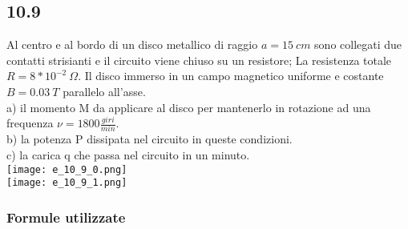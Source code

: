 \documentclass[../../main.tex]{subfiles}
\begin{document}
\subsection*{10.9}
Al centro e al bordo di un disco metallico di raggio $a=15\ cm$ sono collegati due contatti strisianti e il circuito viene chiuso su un resistore; La resistenza totale $R= 8*10^{-2}\ \Omega$. Il disco immerso in un campo magnetico uniforme e costante $B=0.03\ T$ parallelo all'asse.\\
a) il momento M da applicare al disco per mantenerlo in rotazione ad una frequenza $\nu = 1800 \frac{giri}{min}$.\\
b) la potenza P dissipata nel circuito in queste condizioni.\\
c) la carica q che passa nel circuito in un minuto.\\
\texttt{[image: e\_10\_9\_0.png]}\\
\texttt{[image: e\_10\_9\_1.png]}
\subsubsection*{Formule utilizzate}
\end{document}
